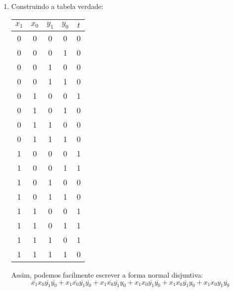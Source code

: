 \documentclass{article}
\begin{document}
\begin{enumerate}
	      \newpage
	\item Construindo a tabela verdade:
	      \begin{center}
		      \begin{tabular}{|c c c c | c|}
			      \hline
			      \( x_1 \) & \( x_0 \) & \( y_1 \) & \( y_0 \) & \( t\) \\ [0.5ex]
			      \hline\hline
			      0         & 0         & 0         & 0         & 0      \\
			      \hline
			      0         & 0         & 0         & 1         & 0      \\
			      \hline
			      0         & 0         & 1         & 0         & 0      \\
			      \hline
			      0         & 0         & 1         & 1         & 0      \\
			      \hline
			      0         & 1         & 0         & 0         & 1      \\
			      \hline
			      0         & 1         & 0         & 1         & 0      \\
			      \hline
			      0         & 1         & 1         & 0         & 0      \\
			      \hline
			      0         & 1         & 1         & 1         & 0      \\
			      \hline
			      1         & 0         & 0         & 0         & 1      \\
			      \hline
			      1         & 0         & 0         & 1         & 1      \\
			      \hline
			      1         & 0         & 1         & 0         & 0      \\
			      \hline
			      1         & 0         & 1         & 1         & 0      \\
			      \hline
			      1         & 1         & 0         & 0         & 1      \\
			      \hline
			      1         & 1         & 0         & 1         & 1      \\
			      \hline
			      1         & 1         & 1         & 0         & 1      \\
			      \hline
			      1         & 1         & 1         & 1         & 0      \\
			      \hline
		      \end{tabular}
	      \end{center}

	      Assim, podemos facilmente escrever a forma normal disjuntiva:
	      \[ \overline{x_1} x_0 \overline{y_1} \overline{y_0} + x_1 \overline{x_0} \overline{y_1} \overline{y_0} + x_1 \overline{x_0} \overline{y_1} y_0 + x_1 x_0 \overline{y_1} \overline{y_0} + x_1 x_0 \overline{y_1} y_0 + x_1 x_0 y_1 \overline{y_0}  \]



\end{enumerate}
\end{document}
